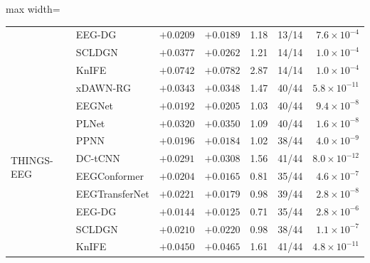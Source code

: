 \begin{table}[H]
\begin{adjustbox}{max width=\textwidth}
\begin{tabular}{@{}llrrrrr@{}}
 & EEG-DG & $+0.0209$ & $+0.0189$ & 1.18 & 13/14 & $7.6\times10^{-4}$ \\
 & SCLDGN & $+0.0377$ & $+0.0262$ & 1.21 & 14/14 & $1.0\times10^{-4}$ \\
 & KnIFE & $+0.0742$ & $+0.0782$ & 2.87 & 14/14 & $1.0\times10^{-4}$ \\
\midrule
\multirow{10}{*}{THINGS-EEG} & xDAWN-RG & $+0.0343$ & $+0.0348$ & 1.47 & 40/44 & $5.8\times10^{-11}$ \\
 & EEGNet & $+0.0192$ & $+0.0205$ & 1.03 & 40/44 & $9.4\times10^{-8}$ \\
 & PLNet & $+0.0320$ & $+0.0350$ & 1.09 & 40/44 & $1.6\times10^{-8}$ \\
 & PPNN & $+0.0196$ & $+0.0184$ & 1.02 & 38/44 & $4.0\times10^{-9}$ \\
 & DC-tCNN & $+0.0291$ & $+0.0308$ & 1.56 & 41/44 & $8.0\times10^{-12}$ \\
 & EEGConformer & $+0.0204$ & $+0.0165$ & 0.81 & 35/44 & $4.6\times10^{-7}$ \\
 & EEGTransferNet & $+0.0221$ & $+0.0179$ & 0.98 & 39/44 & $2.8\times10^{-8}$ \\
 & EEG-DG & $+0.0144$ & $+0.0125$ & 0.71 & 35/44 & $2.8\times10^{-6}$ \\
 & SCLDGN & $+0.0210$ & $+0.0220$ & 0.98 & 38/44 & $1.1\times10^{-7}$ \\
 & KnIFE & $+0.0450$ & $+0.0465$ & 1.61 & 41/44 & $4.8\times10^{-11}$ \\
\bottomrule
\end{tabular}
\end{adjustbox}
\end{table}
